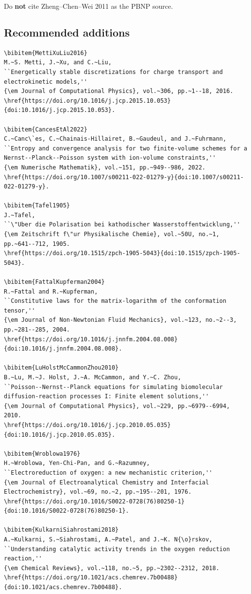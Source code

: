 \documentclass[11pt]{article}
\begin{document}
Do \textbf{not} cite Zheng--Chen--Wei 2011 as the PBNP source.

\subsection{Recommended additions}

\begin{lstlisting}[style=bibstyle]
\bibitem{MettiXuLiu2016}
M.~S. Metti, J.~Xu, and C.~Liu,
``Energetically stable discretizations for charge transport and
electrokinetic models,''
{\em Journal of Computational Physics}, vol.~306, pp.~1--18, 2016.
\href{https://doi.org/10.1016/j.jcp.2015.10.053}{doi:10.1016/j.jcp.2015.10.053}.

\bibitem{CancesEtAl2022}
C.~Canc\`es, C.~Chainais-Hillairet, B.~Gaudeul, and J.~Fuhrmann,
``Entropy and convergence analysis for two finite-volume schemes for a
Nernst--Planck--Poisson system with ion-volume constraints,''
{\em Numerische Mathematik}, vol.~151, pp.~949--986, 2022.
\href{https://doi.org/10.1007/s00211-022-01279-y}{doi:10.1007/s00211-022-01279-y}.

\bibitem{Tafel1905}
J.~Tafel,
``\"Uber die Polarisation bei kathodischer Wasserstoffentwicklung,''
{\em Zeitschrift f\"ur Physikalische Chemie}, vol.~50U, no.~1,
pp.~641--712, 1905.
\href{https://doi.org/10.1515/zpch-1905-5043}{doi:10.1515/zpch-1905-5043}.

\bibitem{FattalKupferman2004}
R.~Fattal and R.~Kupferman,
``Constitutive laws for the matrix-logarithm of the conformation tensor,''
{\em Journal of Non-Newtonian Fluid Mechanics}, vol.~123, no.~2--3,
pp.~281--285, 2004.
\href{https://doi.org/10.1016/j.jnnfm.2004.08.008}{doi:10.1016/j.jnnfm.2004.08.008}.

\bibitem{LuHolstMcCammonZhou2010}
B.~Lu, M.~J. Holst, J.~A. McCammon, and Y.~C. Zhou,
``Poisson--Nernst--Planck equations for simulating biomolecular
diffusion-reaction processes I: Finite element solutions,''
{\em Journal of Computational Physics}, vol.~229, pp.~6979--6994, 2010.
\href{https://doi.org/10.1016/j.jcp.2010.05.035}{doi:10.1016/j.jcp.2010.05.035}.

\bibitem{Wroblowa1976}
H.~Wroblowa, Yen-Chi-Pan, and G.~Razumney,
``Electroreduction of oxygen: a new mechanistic criterion,''
{\em Journal of Electroanalytical Chemistry and Interfacial
Electrochemistry}, vol.~69, no.~2, pp.~195--201, 1976.
\href{https://doi.org/10.1016/S0022-0728(76)80250-1}{doi:10.1016/S0022-0728(76)80250-1}.

\bibitem{KulkarniSiahrostami2018}
A.~Kulkarni, S.~Siahrostami, A.~Patel, and J.~K. N{\o}rskov,
``Understanding catalytic activity trends in the oxygen reduction reaction,''
{\em Chemical Reviews}, vol.~118, no.~5, pp.~2302--2312, 2018.
\href{https://doi.org/10.1021/acs.chemrev.7b00488}{doi:10.1021/acs.chemrev.7b00488}.


\end{lstlisting}
\end{document}
